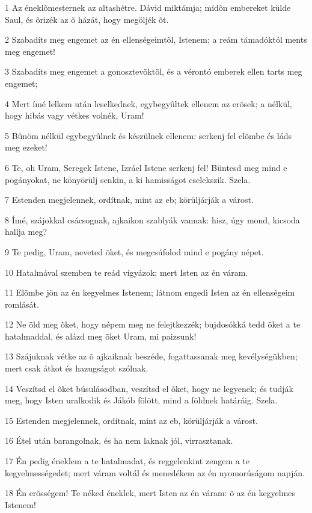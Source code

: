\par 1 Az éneklõmesternek az altashétre. Dávid miktámja; midõn embereket külde Saul, és õrizék az õ házát, hogy megöljék õt.
\par 2 Szabadíts meg engemet az én ellenségeimtõl, Istenem; a reám támadóktól ments meg engemet!
\par 3 Szabadíts meg engemet a gonosztevõktõl, és a vérontó emberek ellen tarts meg engemet;
\par 4 Mert ímé lelkem után leselkednek, egybegyûltek ellenem az erõsek; a nélkül, hogy hibás vagy vétkes volnék, Uram!
\par 5 Bûnöm nélkül egybegyûlnek és készülnek ellenem: serkenj fel elõmbe és láds meg ezeket!
\par 6 Te, oh Uram, Seregek Istene, Izráel Istene serkenj fel! Büntesd meg mind e pogányokat, ne könyörülj senkin, a ki hamisságot cselekszik. Szela.
\par 7 Estenden megjelennek, ordítnak, mint az eb; körüljárják a várost.
\par 8 Ímé, szájokkal csácsognak, ajkaikon szablyák vannak: hisz, úgy mond, kicsoda hallja meg?
\par 9 Te pedig, Uram, neveted õket, és megcsúfolod mind e pogány népet.
\par 10 Hatalmával szemben te reád vigyázok; mert Isten az én váram.
\par 11 Elõmbe jön az én kegyelmes Istenem; látnom engedi Isten az én ellenségeim romlását.
\par 12 Ne öld meg õket, hogy népem meg ne felejtkezzék; bujdosókká tedd õket a te hatalmaddal, és alázd meg õket Uram, mi paizsunk!
\par 13 Szájuknak vétke az õ ajkaiknak beszéde, fogattassanak meg kevélységükben; mert csak átkot és hazugságot szólnak.
\par 14 Veszítsd el õket búsulásodban, veszítsd el õket, hogy ne legyenek; és tudják meg, hogy Isten uralkodik és Jákób fölött, mind a földnek határáig. Szela.
\par 15 Estenden megjelennek, ordítnak, mint az eb, körüljárják a várost.
\par 16 Étel után barangolnak, és ha nem laknak jól, virrasztanak.
\par 17 Én pedig éneklem a te hatalmadat, és reggelenkint zengem a te kegyelmességedet; mert váram voltál és menedékem az én nyomorúságom napján.
\par 18 Én erõsségem! Te néked éneklek, mert Isten az én váram: õ az én kegyelmes Istenem!

